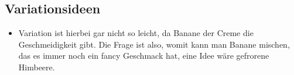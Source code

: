     \subsection*{Variationsideen}
      \begin{itemize}
        \item Variation ist hierbei gar nicht so leicht, da Banane der Creme die
              Geschmeidigkeit gibt. Die Frage ist also, womit kann man Banane
              mischen, das es immer noch ein fancy Geschmack hat, eine Idee wäre
              gefrorene Himbeere.
      \end{itemize}
